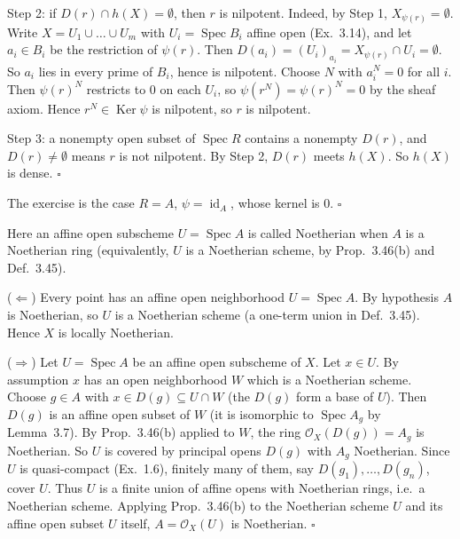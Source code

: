 \documentclass[11pt]{article}
\begin{document}
Step 2: if $D(r)\cap h(X)=\emptyset$, then $r$ is nilpotent. Indeed, by Step 1, $X_{\psi(r)}=\emptyset$. Write $X=U_1\cup\dots\cup U_m$ with $U_i=\operatorname{Spec}B_i$ affine open (Ex.~3.14), and let $a_i\in B_i$ be the restriction of $\psi(r)$. Then $D(a_i)=(U_i)_{a_i}=X_{\psi(r)}\cap U_i=\emptyset$. So $a_i$ lies in every prime of $B_i$, hence is nilpotent. Choose $N$ with $a_i^N=0$ for all $i$. Then $\psi(r)^N$ restricts to $0$ on each $U_i$, so $\psi(r^N)=\psi(r)^N=0$ by the sheaf axiom. Hence $r^N\in\operatorname{Ker}\psi$ is nilpotent, so $r$ is nilpotent.

Step 3: a nonempty open subset of $\operatorname{Spec}R$ contains a nonempty $D(r)$, and $D(r)\neq\emptyset$ means $r$ is not nilpotent. By Step 2, $D(r)$ meets $h(X)$. So $h(X)$ is dense. $\square$

The exercise is the case $R=A$, $\psi=\operatorname{id}_A$, whose kernel is $0$. \hfill$\square$

\pf
Here an affine open subscheme $U=\operatorname{Spec}A$ is called Noetherian when $A$ is a Noetherian ring (equivalently, $U$ is a Noetherian scheme, by Prop.~3.46(b) and Def.~3.45).

($\Leftarrow$) Every point has an affine open neighborhood $U=\operatorname{Spec}A$. By hypothesis $A$ is Noetherian, so $U$ is a Noetherian scheme (a one-term union in Def.~3.45). Hence $X$ is locally Noetherian.

($\Rightarrow$) Let $U=\operatorname{Spec}A$ be an affine open subscheme of $X$. Let $x\in U$. By assumption $x$ has an open neighborhood $W$ which is a Noetherian scheme. Choose $g\in A$ with $x\in D(g)\subseteq U\cap W$ (the $D(g)$ form a base of $U$). Then $D(g)$ is an affine open subset of $W$ (it is isomorphic to $\operatorname{Spec}A_g$ by Lemma~3.7). By Prop.~3.46(b) applied to $W$, the ring $\mathcal{O}_X(D(g))=A_g$ is Noetherian. So $U$ is covered by principal opens $D(g)$ with $A_g$ Noetherian. Since $U$ is quasi-compact (Ex.~1.6), finitely many of them, say $D(g_1),\dots,D(g_n)$, cover $U$. Thus $U$ is a finite union of affine opens with Noetherian rings, i.e.\ a Noetherian scheme. Applying Prop.~3.46(b) to the Noetherian scheme $U$ and its affine open subset $U$ itself, $A=\mathcal{O}_X(U)$ is Noetherian. \hfill$\square$
\end{document}
